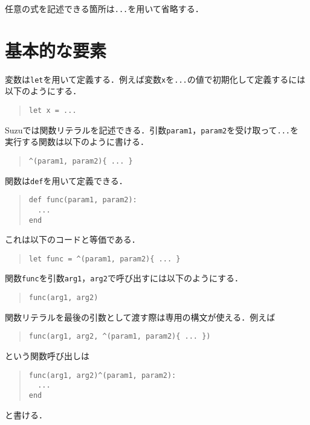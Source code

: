 \documentclass[a4paper,11pt,dvipdfmx]{jreport}
\begin{document}
任意の式を記述できる箇所は\verb|...|を用いて省略する．

\section{基本的な要素}

変数は\verb|let|を用いて定義する．例えば変数\verb|x|を\verb|...|の値で初期化して定義するには
以下のようにする．
\begin{quote}
\begin{verbatim}
let x = ...
\end{verbatim}
\end{quote}

Suzuでは関数リテラルを記述できる．引数\verb|param1|，\verb|param2|を受け取って\verb|...|を
実行する関数は以下のように書ける．
\begin{quote}
\begin{verbatim}
^(param1, param2){ ... }
\end{verbatim}
\end{quote}

関数は\verb|def|を用いて定義できる．
\begin{quote}
\begin{verbatim}
def func(param1, param2):
  ...
end
\end{verbatim}
\end{quote}
これは以下のコードと等価である．
\begin{quote}
\begin{verbatim}
let func = ^(param1, param2){ ... }
\end{verbatim}
\end{quote}

関数\verb|func|を引数\verb|arg1|，\verb|arg2|で呼び出すには以下のようにする．
\begin{quote}
\begin{verbatim}
func(arg1, arg2)
\end{verbatim}
\end{quote}

関数リテラルを最後の引数として渡す際は専用の構文が使える．例えば
\begin{quote}
\begin{verbatim}
func(arg1, arg2, ^(param1, param2){ ... })
\end{verbatim}
\end{quote}
という関数呼び出しは
\begin{quote}
\begin{verbatim}
func(arg1, arg2)^(param1, param2):
  ...
end
\end{verbatim}
\end{quote}
と書ける．
\end{document}
